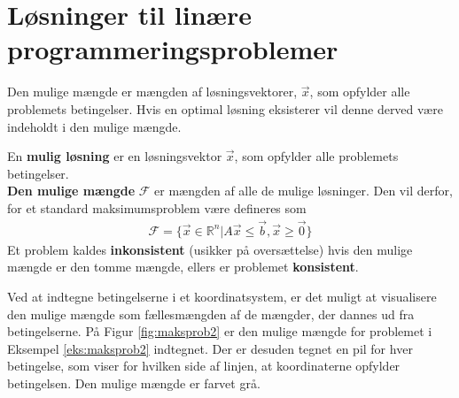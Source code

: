 \section{Løsninger til linære programmeringsproblemer}

Den mulige mængde er mængden af løsningsvektorer, $\vec{x}$, som opfylder alle problemets betingelser. Hvis en optimal løsning eksisterer vil denne derved være indeholdt i den mulige mængde.

\begin{defn}
En \textbf{mulig løsning} er en løsningsvektor $\vec{x}$, som opfylder alle problemets betingelser.\\
\textbf{Den mulige mængde} $\mathcal{F}$ er mængden af alle de mulige løsninger. Den vil derfor, for et standard maksimumsproblem være defineres som
\begin{align*}
\mathcal{F}=\{\vec{x} \in \mathds{R}^n|A\vec{x} \leq \vec{b}, \vec{x} \geq \vec{0}\}
\end{align*}
Et problem kaldes \textbf{inkonsistent} (usikker på oversættelse) hvis den mulige mængde er den tomme mængde, ellers er problemet \textbf{konsistent}. %
\end{defn}


\begin{eks}
Ved at indtegne betingelserne i et koordinatsystem, er det muligt at visualisere den mulige mængde som fællesmængden af de mængder, der dannes ud fra betingelserne. På Figur \ref{fig:maksprob2} er den mulige mængde for problemet i Eksempel \ref{eks:maksprob2} indtegnet. Der er desuden tegnet en pil for hver betingelse, som viser for hvilken side af linjen, at koordinaterne opfylder betingelsen. Den mulige mængde er farvet grå.

\begin{center}
	
	\label{fig:maksprob2}
\end{center}

\end{eks}